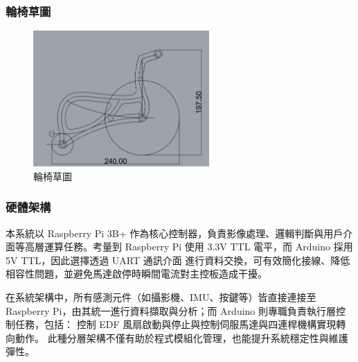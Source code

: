 \documentclass[12pt]{article}       %
\begin{document}
\subsubsection{輪椅草圖}
\hspace{2em}
\begin{figure}[H]
    \centering
    \includegraphics[width=0.6\textwidth]{6.jpg}     %
    \caption{輪椅草圖}    %
    \label{fig:6}    %
\end{figure}

\subsubsection{硬體架構}
\hspace{2em}本系統以 Raspberry Pi 3B+ 作為核心控制器，負責影像處理、邏輯判斷與用戶介面等高層運算任務。考量到 Raspberry Pi 使用 3.3V TTL 電平，而 Arduino 採用 5V TTL，因此選擇透過 UART 通訊介面 進行資料交換，可有效簡化接線、降低相容性問題，並避免馬達啟停時瞬間電流對主控板造成干擾。

在系統架構中，所有感測元件（如攝影機、IMU、按鍵等）皆直接連接至 Raspberry Pi，由其統一進行資料擷取與分析；而 Arduino 則專職負責執行層控制任務，包括：
控制 EDF 風扇啟動與停止與控制伺服馬達與四連桿機構實現轉向動作。
此種分層架構不僅有助於程式模組化管理，也能提升系統穩定性與維護彈性。
\end{document}
